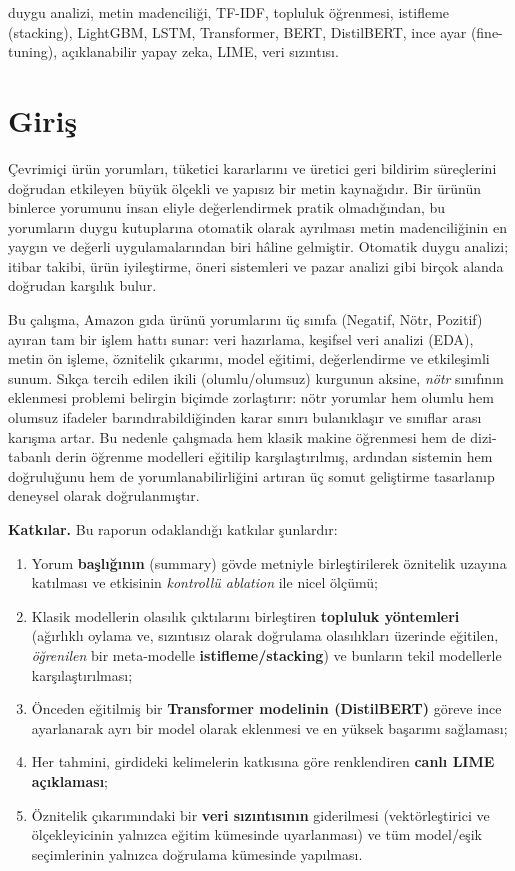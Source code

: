 \documentclass[conference]{IEEEtran}
\begin{document}
\begin{IEEEkeywords}
duygu analizi, metin madenciliği, TF-IDF, topluluk öğrenmesi, istifleme (stacking),
LightGBM, LSTM, Transformer, BERT, DistilBERT, ince ayar (fine-tuning),
açıklanabilir yapay zeka, LIME, veri sızıntısı.
\end{IEEEkeywords}

\section{Giriş}
Çevrimiçi ürün yorumları, tüketici kararlarını ve üretici geri bildirim
süreçlerini doğrudan etkileyen büyük ölçekli ve yapısız bir metin kaynağıdır.
Bir ürünün binlerce yorumunu insan eliyle değerlendirmek pratik olmadığından,
bu yorumların duygu kutuplarına otomatik olarak ayrılması metin madenciliğinin
en yaygın ve değerli uygulamalarından biri hâline gelmiştir. Otomatik duygu
analizi; itibar takibi, ürün iyileştirme, öneri sistemleri ve pazar analizi gibi
birçok alanda doğrudan karşılık bulur.

Bu çalışma, Amazon gıda ürünü yorumlarını üç sınıfa (Negatif, Nötr, Pozitif)
ayıran tam bir işlem hattı sunar: veri hazırlama, keşifsel veri analizi (EDA),
metin ön işleme, öznitelik çıkarımı, model eğitimi, değerlendirme ve etkileşimli
sunum. Sıkça tercih edilen ikili (olumlu/olumsuz) kurgunun aksine, \emph{nötr}
sınıfının eklenmesi problemi belirgin biçimde zorlaştırır: nötr yorumlar hem
olumlu hem olumsuz ifadeler barındırabildiğinden karar sınırı bulanıklaşır ve
sınıflar arası karışma artar. Bu nedenle çalışmada hem klasik makine öğrenmesi
hem de dizi-tabanlı derin öğrenme modelleri eğitilip karşılaştırılmış, ardından
sistemin hem doğruluğunu hem de yorumlanabilirliğini artıran üç somut geliştirme
tasarlanıp deneysel olarak doğrulanmıştır.

\textbf{Katkılar.} Bu raporun odaklandığı katkılar şunlardır:
\begin{enumerate}
\item Yorum \textbf{başlığının} (summary) gövde metniyle birleştirilerek öznitelik
uzayına katılması ve etkisinin \emph{kontrollü ablation} ile nicel ölçümü;
\item Klasik modellerin olasılık çıktılarını birleştiren \textbf{topluluk
yöntemleri} (ağırlıklı oylama ve, sızıntısız olarak doğrulama olasılıkları üzerinde
eğitilen, \emph{öğrenilen} bir meta-modelle \textbf{istifleme/stacking}) ve bunların
tekil modellerle karşılaştırılması;
\item Önceden eğitilmiş bir \textbf{Transformer modelinin (DistilBERT)} göreve ince
ayarlanarak ayrı bir model olarak eklenmesi ve en yüksek başarımı sağlaması;
\item Her tahmini, girdideki kelimelerin katkısına göre renklendiren
\textbf{canlı LIME açıklaması};
\item Öznitelik çıkarımındaki bir \textbf{veri sızıntısının} giderilmesi
(vektörleştirici ve ölçekleyicinin yalnızca eğitim kümesinde uyarlanması) ve tüm
model/eşik seçimlerinin yalnızca doğrulama kümesinde yapılması.
\end{enumerate}
\end{document}
